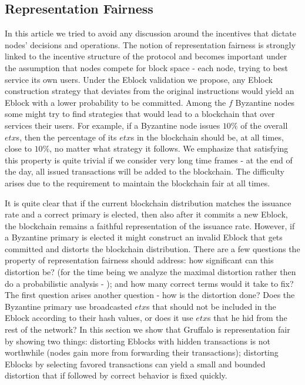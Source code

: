 \subsection{Representation Fairness}\label{subsec:repfair}
In this article we tried to avoid any discussion around the incentives that dictate nodes' decisions and operations. The notion of representation fairness is strongly linked to the incentive structure of the protocol and becomes important under the assumption that nodes compete for block space - each node, trying to best service its own users. 
Under the Eblock validation we propose, any Eblock construction strategy that deviates from the original instructions would yield an Eblock with a lower probability to be committed. Among the $f$ Byzantine nodes some might try to find strategies that would lead to a blockchain that over services their users. For example, if a Byzantine node issues $10\%$ of the overall $etx$s, then the percentage of its $etx$s in the blockchain should be, at all times, close to $10\%$, no matter what strategy it follows. We emphasize that satisfying this property is quite trivial if we consider very long time frames - at the end of the day, all issued transactions will be added to the blockchain. The difficulty arises due to the requirement to maintain the blockchain fair at all times.

It is quite clear that if the current blockchain distribution matches the issuance rate and a correct primary is elected, then also after it commits a new Eblock, the blockchain remains a faithful representation of the issuance rate. However, if a Byzantine primary is elected it might construct an invalid Eblock that gets committed and distorts the blockchain distribution. There are a few questions the property of representation fairness should address: how significant can this distortion be? (for the time being we analyze the maximal distortion rather then do a probabilistic analysis - ); and how many correct terms would it take to fix? The first question arises another question - how is the distortion done? Does the Byzantine primary use broadcasted $etx$s that should not be included in the Eblock according to their hash values, or does it use $etx$s that he hid from the rest of the network? 
In this section we show that Gruffalo is representation fair by showing two things: distorting Eblocks with hidden transactions is not worthwhile (nodes gain more from forwarding their transactions); distorting Eblocks by selecting favored transactions can yield a small and bounded distortion that if followed by correct behavior is fixed quickly.

